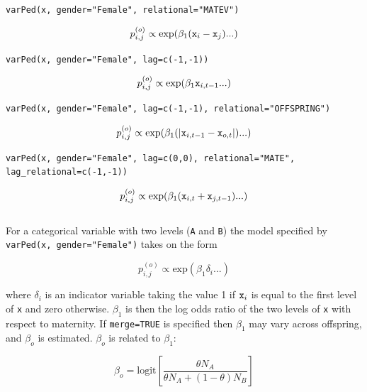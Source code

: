 \documentclass{article}
\begin{document}
\texttt{varPed(x, gender="Female", relational="MATEV")}

\begin{equation}
p^{(o)}_{i,j} \propto \textrm{exp}(\beta_{1}(\textrm{\texttt{x}}_{i}-\textrm{\texttt{x}}_{j})...)
\end{equation}

\texttt{varPed(x, gender="Female", lag=c(-1,-1))}

\begin{equation}
p^{(o)}_{i,j} \propto \textrm{exp}(\beta_{1}\textrm{\texttt{x}}_{i,t-1}...)
\end{equation}

\texttt{varPed(x, gender="Female", lag=c(-1,-1), relational="OFFSPRING")}

\begin{equation}
p^{(o)}_{i,j} \propto \textrm{exp}(\beta_{1}(|\textrm{\texttt{x}}_{i,t-1}-\textrm{\texttt{x}}_{o,t}|)...)
\end{equation}

\texttt{varPed(x, gender="Female", lag=c(0,0), relational="MATE",}\\
\texttt{lag\_relational=c(-1,-1))}

\begin{equation}
p^{(o)}_{i,j} \propto \textrm{exp}(\beta_{1}(\textrm{\texttt{x}}_{i,t}+\textrm{\texttt{x}}_{j,t-1})...)
\end{equation}\\

For a categorical variable with two levels (\texttt{A} and \texttt{B}) the model specified by \texttt{varPed(x, gender="Female")} takes on the form

\begin{equation}
p^{(o)}_{i,j} \propto \textrm{exp}(\beta_{1}\delta_{i}...)
\end{equation}

where $\delta_{i}$ is an indicator variable taking the value 1 if $\textrm{\texttt{x}}_{i}$ is equal to the first level of \texttt{x} and zero otherwise. $\beta_{1}$ is then the log odds ratio of the two levels of \texttt{x} with respect to maternity.  If \texttt{merge=TRUE} is specified then $\beta_{1}$ may vary across offspring, and $\beta_{o}$ is estimated. $\beta_{o}$ is related to $\beta_{1}$:

\begin{equation}
\beta_{o}  = \textrm{logit}\left[\frac{\theta N_{A}}{\theta N_{A} + (1-\theta)N_{B}}\right]
\end{equation}
\end{document}
